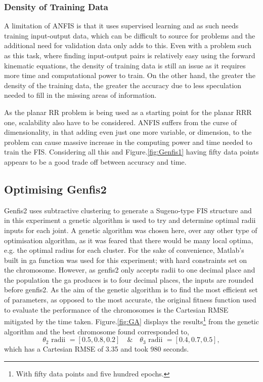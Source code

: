 \documentclass[11.5pt, twoside, a4paper]{article}
\begin{document}
\subsubsection{Density of Training Data}

A limitation of ANFIS is that it uses supervised learning and as such needs training input-output data, which can be difficult to source for problems and the additional need for validation data only adds to this. Even with a problem such as this task, where finding input-output pairs is relatively easy using the forward kinematic equations, the density of training data is still an issue as it requires more time and computational power to train. On the other hand, the greater the density of the training data, the greater the accuracy due to less speculation needed to fill in the missing areas of information.

As the planar RR problem is being used as a starting point for the planar RRR one, scalability also have to be considered. ANFIS suffers from the curse of dimensionality, in that adding even just one more variable, or dimension, to the problem can cause massive increase in the computing power and time needed to train the FIS. Considering all this and Figure.\ref{fig:Genfis1} having fifty data points appears to be a good trade off between accuracy and time. 

\subsection{Optimising Genfis2} \label{sec:GA}
Genfis2 uses subtractive clustering to generate a Sugeno-type FIS structure \cite{genfis2} and in this experiment a genetic algorithm is used to try and determine optimal radii inputs for each joint. A genetic algorithm was chosen here, over any other type of optimisation algorithm, as it was feared that there would be many local optima, e.g. the optimal radius for each cluster. For the sake of convenience, Matlab's built in ga function was used for this experiment; with hard constraints set on the chromosome. However, as genfis2 only accepts radii to one decimal place and the population the ga produces is to four decimal places, the inputs are rounded before genfis2. As the aim of the genetic algorithm is to find the most efficient set of parameters, as opposed to the most accurate, the original fitness function used to evaluate the performance of the chromosomes is the Cartesian RMSE mitigated by the time taken. Figure.\ref{fig:GA} displays the results\footnote{With fifty data points and five hundred epochs.} from the genetic algorithm and the best chromosome found corresponded to,
\begin{equation*}
\theta_2\text{ radii }= [0.5, 0.8, 0.2] \quad \& \quad \theta_3\text{ radii } = [0.4, 0.7,  0.5], 
\end{equation*}
which has a Cartesian RMSE of 3.35 and took 980 seconds.
\end{document}
